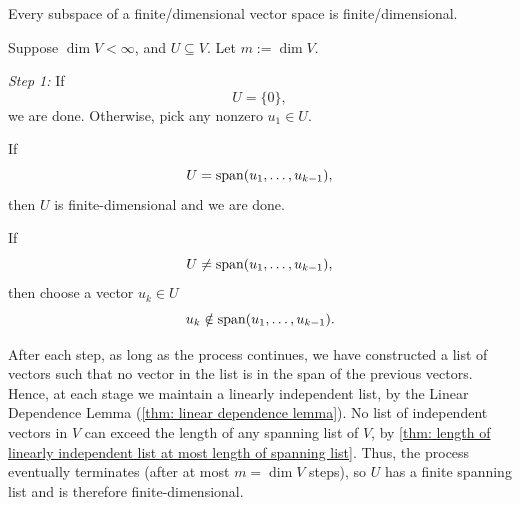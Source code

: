 \setcounter{thm}{24}
\begin{thm} 
  \label{thm: finite-dimensional subspace}
  Every subspace of a finite\-/dimensional vector space is finite\-/dimensional.
\end{thm}
\begin{prf}
  Suppose $\dim V<\infty$, and $U\subseteq V$. Let $m := \dim V$.

  \emph{Step 1:} If
  \begin{equation}
    U = \{0\},
  \end{equation}
  we are done. Otherwise, pick any nonzero $u_1 \in U$.

   If
  \begin{equation}
    U = \operatorname{span} (u_1, \ldots, u_{k-1}),
  \end{equation}
  then $U$ is finite-dimensional and we are done.

  If
  \begin{equation}
    U \neq \operatorname{span} (u_1, \ldots, u_{k-1}),
  \end{equation}
  then choose a vector $u_k \in U$ \st
  \begin{equation}
    u_k \notin \operatorname{span} (u_1, \ldots, u_{k-1}).
  \end{equation}

  After each step, as long as the process continues, we have constructed a list of vectors such that no vector in the list is in the span of the previous vectors. Hence, at each stage we maintain a linearly independent list, by the Linear Dependence Lemma (\ref{thm: linear dependence lemma}). No list of independent vectors in $V$ can exceed the length of any spanning list of $V$, by \ref{thm: length of linearly independent list at most length of spanning list}.
  Thus, the process eventually terminates (after at most $m=\dim V$ steps), so $U$ has a finite spanning list and is therefore finite-dimensional.
\end{prf}